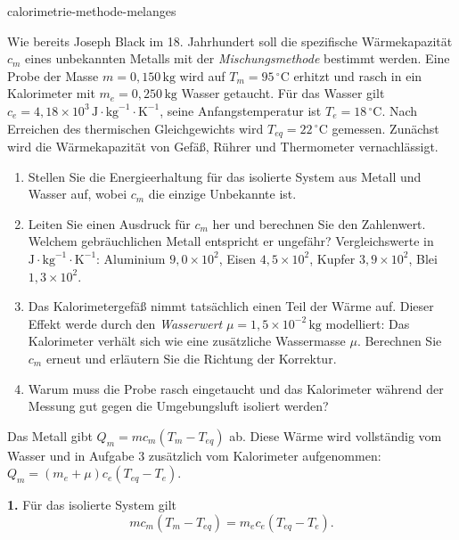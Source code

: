 \begin{exo}{calorimetrie-methode-melanges}

Wie bereits Joseph Black im 18. Jahrhundert soll die spezifische Wärmekapazität $c_m$ eines unbekannten Metalls mit der \emph{Mischungsmethode} bestimmt werden. Eine Probe der Masse $m=0{,}150\,\text{kg}$ wird auf $T_m=95\,^\circ\text{C}$ erhitzt und rasch in ein Kalorimeter mit $m_e=0{,}250\,\text{kg}$ Wasser getaucht. Für das Wasser gilt $c_e=4{,}18\times10^3\,\text{J}\!\cdot\!\text{kg}^{-1}\!\cdot\!\text{K}^{-1}$, seine Anfangstemperatur ist $T_e=18\,^\circ\text{C}$. Nach Erreichen des thermischen Gleichgewichts wird $T_{eq}=22\,^\circ\text{C}$ gemessen. Zunächst wird die Wärmekapazität von Gefäß, Rührer und Thermometer vernachlässigt.

\begin{enumerate}
  \item Stellen Sie die Energieerhaltung für das isolierte System aus Metall und Wasser auf, wobei $c_m$ die einzige Unbekannte ist.
  \item Leiten Sie einen Ausdruck für $c_m$ her und berechnen Sie den Zahlenwert. Welchem gebräuchlichen Metall entspricht er ungefähr? Vergleichswerte in $\text{J}\!\cdot\!\text{kg}^{-1}\!\cdot\!\text{K}^{-1}$: Aluminium $9{,}0\times10^2$, Eisen $4{,}5\times10^2$, Kupfer $3{,}9\times10^2$, Blei $1{,}3\times10^2$.
  \item Das Kalorimetergefäß nimmt tatsächlich einen Teil der Wärme auf. Dieser Effekt werde durch den \emph{Wasserwert} $\mu=1{,}5\times10^{-2}\,\text{kg}$ modelliert: Das Kalorimeter verhält sich wie eine zusätzliche Wassermasse $\mu$. Berechnen Sie $c_m$ erneut und erläutern Sie die Richtung der Korrektur.
  \item Warum muss die Probe rasch eingetaucht und das Kalorimeter während der Messung gut gegen die Umgebungsluft isoliert werden?
\end{enumerate}

\begin{indication}
Das Metall gibt $Q_m=mc_m(T_m-T_{eq})$ ab. Diese Wärme wird vollständig vom Wasser und in Aufgabe 3 zusätzlich vom Kalorimeter aufgenommen: $Q_m=(m_e+\mu)c_e(T_{eq}-T_e)$.
\end{indication}

\begin{solution}
\textbf{1.} Für das isolierte System gilt
\[
mc_m(T_m-T_{eq})=m_ec_e(T_{eq}-T_e).
\]


\end{solution}
\end{exo}
